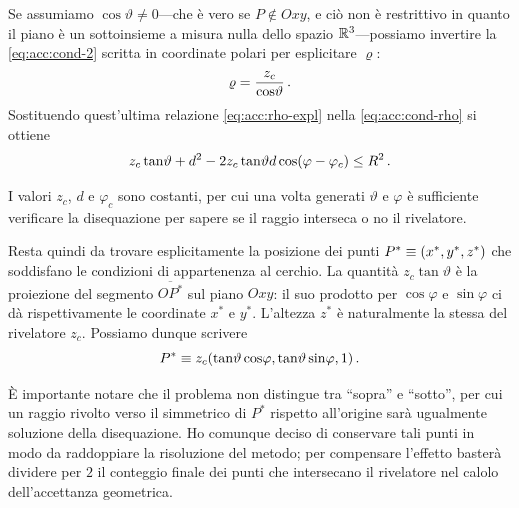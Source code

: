             Se assumiamo $\cos\!\vartheta \neq 0$---che è vero se $P \notin Oxy$, e ciò non è restrittivo in quanto il piano è un sottoinsieme a misura nulla dello spazio $\mathbb{R}^3$---possiamo invertire la \eqref{eq:acc:cond-2} scritta in coordinate polari per esplicitare $\varrho$:
            \begin{equation}
                \varrho = \frac{z_c}{\cos\!\vartheta}
                \,.
                \label{eq:acc:rho-expl}
            \end{equation}
            Sostituendo quest'ultima relazione \eqref{eq:acc:rho-expl} nella \eqref{eq:acc:cond-rho} si ottiene
            \begin{equation}
                z_c \tan\!\vartheta + d^2 - 2 z_c \tan\!\vartheta d \cos\!\pqty{\varphi - \varphi_c} \leq R^2
                \myperiod
                \label{eq:acc:diseq}
            \end{equation}

            I valori $z_c$, $d$ e $\varphi_c$ sono costanti, per cui una volta generati $\vartheta$ e $\varphi$ è sufficiente verificare la disequazione per sapere se il raggio interseca o no il rivelatore.
            
            Resta quindi da trovare esplicitamente la posizione dei punti $P^*\equiv\pqty{x^*, y^*, z^*}$ che soddisfano le condizioni di appartenenza al cerchio. La quantità $z_c \tan\!\vartheta$ è la proiezione del segmento $\overline{OP^*}$ sul piano $Oxy$: il suo prodotto per $\cos\!\varphi$ e $\sin\!\varphi$ ci dà rispettivamente le coordinate $x^*$ e $y^*$. L'altezza $z^*$ è naturalmente la stessa del rivelatore $z_c$. Possiamo dunque scrivere
            \begin{equation*}                
                P^*\equiv z_c \pqty{\tan\!\vartheta \cos\!\varphi, \tan\!\vartheta \sin\!\varphi, 1}
                \myperiod
            \end{equation*}
            
            È importante notare che il problema non distingue tra ``sopra'' e ``sotto'', per cui un raggio rivolto verso il simmetrico di $P^*$ rispetto all'origine sarà ugualmente soluzione della disequazione. Ho comunque deciso di conservare tali punti in modo da raddoppiare la risoluzione del metodo; per compensare l'effetto basterà dividere per $2$ il conteggio finale dei punti che intersecano il rivelatore nel calolo dell'accettanza geometrica.

